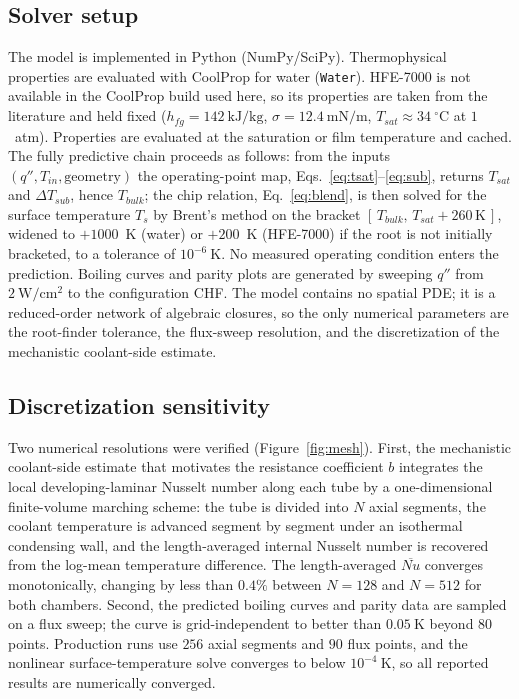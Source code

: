 \documentclass[11pt]{article}
\begin{document}
\subsection{Solver setup}
The model is implemented in Python (NumPy/SciPy). Thermophysical properties are evaluated
with CoolProp for water (\texttt{Water}). HFE-7000 is not available in the CoolProp build used
here, so its properties are taken from the literature \cite{elgenk2021a} and held fixed
($h_{fg}=142~\mathrm{kJ/kg}$, $\sigma=12.4~\mathrm{mN/m}$, $T_{sat}\approx34~^\circ$C at $1$~atm).
Properties are evaluated at the saturation or film temperature and cached. The fully predictive chain proceeds as follows: from the
inputs $(q'',T_{in},\text{geometry})$ the operating-point map, Eqs.~\eqref{eq:tsat}--\eqref{eq:sub},
returns $T_{sat}$ and $\Delta T_{sub}$, hence $T_{bulk}$; the chip relation,
Eq.~\eqref{eq:blend}, is then solved for the surface temperature $T_s$ by Brent's method on
the bracket $[\,T_{bulk},\,T_{sat}+260\,\mathrm{K}\,]$, widened to $+1000$~K (water) or $+200$~K
(HFE-7000) if the root is not initially bracketed, to a tolerance of $10^{-6}~\mathrm{K}$. No measured operating condition enters the prediction. Boiling curves
and parity plots are generated by sweeping $q''$ from $2~\mathrm{W/cm^2}$ to the
configuration CHF. The model contains no spatial PDE; it is a reduced-order network of
algebraic closures, so the only numerical parameters are the root-finder tolerance, the
flux-sweep resolution, and the discretization of the mechanistic coolant-side estimate.

\subsection{Discretization sensitivity}
Two numerical resolutions were verified (Figure~\ref{fig:mesh}). First, the mechanistic
coolant-side estimate that motivates the resistance coefficient $b$ integrates the local
developing-laminar Nusselt number along each tube by a one-dimensional finite-volume
marching scheme: the tube is divided into $N$ axial segments, the coolant temperature is
advanced segment by segment under an isothermal condensing wall, and the length-averaged
internal Nusselt number is recovered from the log-mean temperature difference. The
length-averaged $\overline{Nu}$ converges monotonically, changing by less than $0.4\%$
between $N=128$ and $N=512$ for both chambers. Second, the predicted boiling curves and
parity data are sampled on a flux sweep; the curve is grid-independent to better than
$0.05~\mathrm{K}$ beyond $80$ points. Production runs use $256$ axial segments and $90$
flux points, and the nonlinear surface-temperature solve converges to below
$10^{-4}~\mathrm{K}$, so all reported results are numerically converged.
\end{document}
